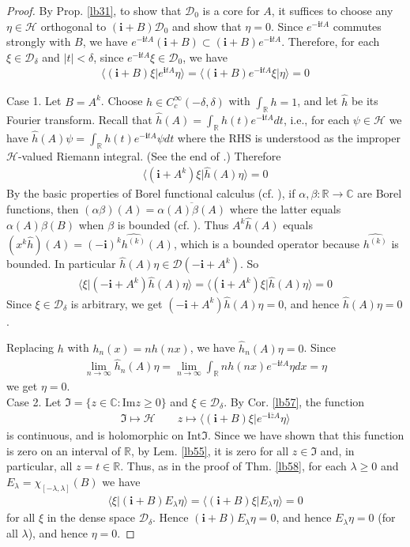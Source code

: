 \documentclass[12pt,b5paper,notitlepage]{article}
\theoremstyle{definition}
\theoremstyle{plain}
\newcommand{\fk}{\mathfrak}
\newcommand{\mc}{\mathcal}
\newcommand{\wht}{\widehat}
\newcommand{\ovl}{\overline}
\newcommand{\Dom}{\scr{D}}
\newcommand{\bk}[1]{\langle {#1}\rangle}
\newcommand{\scr}{\mathscr}
\newcommand{\im}{\mathbf{i}}
\newcommand{\Cbb}{\mathbb C}
\newcommand{\Rbb}{\mathbb R}
\newcommand{\Imag}{\mathrm{Im}}
\newcommand{\Int}{\mathrm{Int}}
\numberwithin{equation}{section}
\begin{document}
\begin{proof}
By Prop. \ref{lb31}, to show that $\Dom_0$ is a core for $A$, it suffices to choose any $\eta\in\mc H$ orthogonal to $(\im+B)\Dom_0$ and show that $\eta=0$. Since $e^{-\im tA}$ commutes strongly with $B$, we have $e^{-\im tA}(\im+B)\subset(\im+B)e^{-\im tA}$. Therefore, for each $\xi\in\Dom_\delta$ and $|t|<\delta$, since $e^{-\im tA}\xi\in\Dom_0$, we have
\begin{align*}
\bk{(\im+B)\xi|e^{\im tA}\eta}=\bk{(\im+B)e^{-\im tA}\xi|\eta}=0
\end{align*}

Case 1. Let $B=A^k$. Choose $h\in C_c^\infty(-\delta,\delta)$ with $\int_\Rbb h=1$, and let $\wht h$ be its Fourier transform. Recall that $\wht h(A)=\int_\Rbb h(t)e^{-\im tA}dt$, i.e., for each $\psi\in\mc H$ we have $\wht h(A)\psi=\int_\Rbb h(t)e^{-\im tA}\psi dt$ where the RHS is understood as the improper $\mc H$-valued Riemann integral. (See the end of \cite[Sec. 10]{Gui-S}.) Therefore
\begin{align*}
\bk{(\im+A^k)\xi|\wht h(A)\eta}=0
\end{align*}
By the basic properties of Borel functional calculus (cf. \cite[Sec. 9]{Gui-S}), if $\alpha,\beta:\Rbb\rightarrow\Cbb$ are Borel functions, then $(\alpha\beta)(A)=\ovl{\alpha(A)\beta(A)}$ where the latter equals $\alpha(A)\beta(B)$ when $\beta$ is bounded (cf. \cite[Prop. 8.1]{Gui-S}). Thus $A^k\wht h(A)$ equals $(x^k\wht h)(A)=(-\im)^k\wht{h^{(k)}}(A)$, which is a bounded operator because $\wht{h^{(k)}}$ is bounded. In particular $\wht h(A)\eta\in\Dom(-\im+A^k)$. So
\begin{align*}
\bk{\xi|(-\im+A^k)\wht h(A)\eta}=\bk{(\im+A^k)\xi|\wht h(A)\eta}=0
\end{align*}
Since $\xi\in\Dom_\delta$ is arbitrary, we get $(-\im+A^k)\wht h(A)\eta=0$, and hence $\wht h(A)\eta=0$. 

Replacing $h$ with $h_n(x)=nh(nx)$, we have $\wht h_n(A)\eta=0$. Since 
\begin{align*}
\lim_{n\rightarrow\infty}\wht h_n(A)\eta=\lim_{n\rightarrow\infty} \int_\Rbb nh(nx)e^{-\im tA}\eta dx=\eta
\end{align*}
we get $\eta=0$.\\[-1ex]

Case 2. Let $\fk I=\{z\in\Cbb:\Imag z\geq0\}$ and $\xi\in\Dom_\delta$. By Cor. \ref{lb57}, the function 
\begin{align*}
\fk I\mapsto\mc H\qquad z\mapsto \bk{(\im+B)\xi|e^{-\im \ovl zA}\eta}
\end{align*}
is continuous, and is holomorphic on $\Int\fk I$. Since we have shown that this function is zero on an interval of $\Rbb$, by Lem. \ref{lb55}, it is zero for all $z\in\fk I$ and, in particular, all $z=t\in\Rbb$. Thus, as in the proof of Thm. \ref{lb58}, for each $\lambda\geq0$ and $E_\lambda=\chi_{[-\lambda,\lambda]}(B)$ we have
\begin{align*}
\bk{\xi|(\im+B)E_\lambda\eta}=\bk{(\im+B)\xi|E_\lambda\eta}=0
\end{align*}
for all $\xi$ in the dense space $\Dom_\delta$. Hence $(\im+B)E_\lambda\eta=0$, and hence $E_\lambda\eta=0$ (for all $\lambda$), and hence $\eta=0$.
\end{proof}
\end{document}
